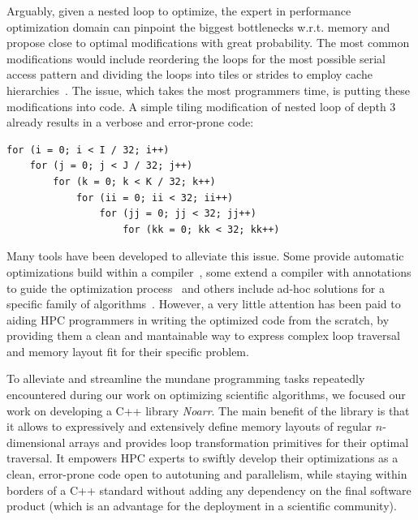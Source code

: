 Arguably, given a nested loop to optimize, the expert in performance optimization domain can pinpoint the biggest bottlenecks w.r.t. memory and propose close to optimal modifications with great probability. The most common modifications would include reordering the loops for the most possible serial access pattern and dividing the loops into tiles or strides to employ cache hierarchies~\cite{wolf1991data}. The issue, which takes the most programmers time, is putting these modifications into code. A simple tiling modification of nested loop of depth 3 already results in a verbose and error-prone code:
\begin{verbatim}
for (i = 0; i < I / 32; i++)
    for (j = 0; j < J / 32; j++)
        for (k = 0; k < K / 32; k++)
            for (ii = 0; ii < 32; ii++)
                for (jj = 0; jj < 32; jj++)
                    for (kk = 0; kk < 32; kk++)
\end{verbatim}

Many tools have been developed to alleviate this issue. Some provide automatic optimizations build within a compiler~\cite{trifunovic2010graphite,grosser2012polly}, some extend a compiler with annotations to guide the optimization process~\cite{donadio2005language,yi2007poet,chen2008chill,namjoshi2016loopy} and others include ad-hoc solutions for a specific family of algorithms~\cite{9485033,AFANASYEV2021100707}. However, a very little attention has been paid to aiding HPC programmers in writing the optimized code from the scratch, by providing them a clean and mantainable way to express complex loop traversal and memory layout fit for their specific problem.

To alleviate and streamline the mundane programming tasks repeatedly encountered during our work on optimizing scientific algorithms, we focused our work on developing a C++ library \emph{Noarr}. The main benefit of the library is that it allows to expressively and extensively define memory layouts of regular $n$-dimensional arrays and provides loop transformation primitives for their optimal traversal. It empowers HPC experts to swiftly develop their optimizations as a clean, error-prone code open to autotuning and parallelism, while staying within borders of a C++ standard without adding any dependency on the final software product (which is an advantage for the deployment in a scientific community).


